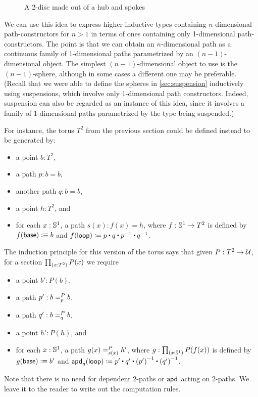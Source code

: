 \begin{figure}
  \centering
  \caption{A 2-disc made out of a hub and spokes}
  \label{fig:hub-and-spokes}
\end{figure}

We can use this idea to express higher inductive types containing $n$-dimensional path-con\-struc\-tors for $n>1$ in terms of ones containing only 1-di\-men\-sion\-al path-con\-struc\-tors.
The point is that we can obtain an $n$-dimensional path as a continuous family of 1-dimensional paths parametrized by an $(n-1)$-di\-men\-sion\-al object.
The simplest $(n-1)$-dimensional object to use is the $(n-1)$-sphere, although in some cases a different one may be preferable.
(Recall that we were able to define the spheres in \autoref{sec:suspension} inductively using suspensions, which involve only 1-dimensional path constructors.
Indeed, suspension can also be regarded as an instance of this idea, since it involves a family of 1-dimensional paths parametrized by the type being suspended.)

For instance, the torus $T^2$ from the previous section could be defined instead to be generated by:
\begin{itemize}
\item a point $b:T^2$,
\item a path $p:b=b$,
\item another path $q:b=b$,
\item a point $h:T^2$, and
\item for each $x:\Sn^1$, a path $s(x) : f(x)=h$, where $f:\Sn^1\to T^2$ is defined by $f(\base)\defeq b$ and $\ap f \lloop \defid p \ct q \ct \opp p \ct \opp q$.
\end{itemize}
The induction principle for this version of the torus says that given $P:T^2\to\type$, for a section $\prd{x:T^2} P(x)$ we require
\begin{itemize}
\item a point $b':P(b)$,
\item a path $p' : \dpath P p b b$,
\item a path $q' : \dpath P q b b$,
\item a point $h':P(h)$, and
\item for each $x:\Sn^1$, a path $\dpath {P}{s(x)}{g(x)}{h'}$, where $g:\prd{x:\Sn^1} P(f(x))$ is defined by $g(\base)\defeq b'$ and $\apd g \lloop \defid p' \ct q' \ct \opp{(p')} \ct \opp{(q')}$.
\end{itemize}
Note that there is no need for dependent 2-paths or $\apdfunc{}$ acting on 2-paths.
We leave it to the reader to write out the computation rules.

